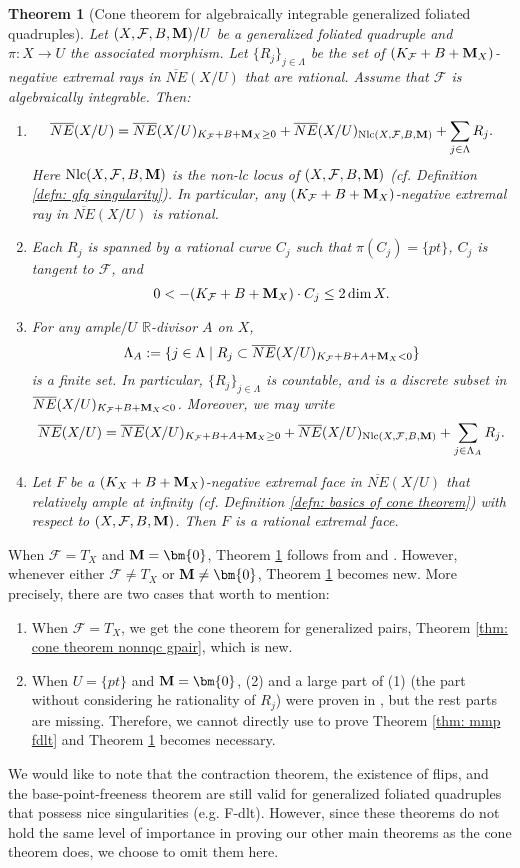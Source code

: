 \documentclass[11pt]{amsart}
\numberwithin{equation}{section}
\newcommand{\Mm}{{\bf{M}}}
\newcommand{\Rr}{\mathbb{R}}
\newcommand{\Nlc}{\operatorname{Nlc}}
\newcommand{\Ff}{\mathcal{F}}
\newtheorem{thm}{Theorem}[subsection]
\theoremstyle{definition}
\theoremstyle{definition}
\theoremstyle{definition}
\begin{document}
\begin{thm}[Cone theorem for algebraically integrable generalized foliated quadruples]\label{thm: cone theorem gfq}
Let $(X,\Ff,B,\Mm)/U$ be a generalized foliated quadruple and $\pi: X\rightarrow U$ the associated morphism. Let $\{R_j\}_{j\in\Lambda}$ be the set of $(K_{\Ff}+B+\Mm_X)$-negative extremal rays in $\overline{NE}(X/U)$ that are rational. Assume that $\Ff$ is algebraically integrable. Then:
\begin{enumerate}
    \item $$\overline{NE}(X/U)=\overline{NE}(X/U)_{K_{\Ff}+B+\Mm_X\geq 0}+\overline{NE}(X/U)_{\Nlc(X,\Ff,B,\Mm)}+\sum_{j\in\Lambda} R_j.$$
    Here $\Nlc(X,\Ff,B,\Mm)$ is the non-lc locus of $(X,\Ff,B,\Mm)$ (cf. Definition \ref{defn: gfq singularity}). In particular, any $(K_{\Ff}+B+\Mm_X)$-negative extremal ray in $\overline{NE}(X/U)$ is rational.
    \item Each $R_j$ is spanned by a rational curve $C_j$ such that $\pi(C_j)=\{pt\}$, $C_j$ is tangent to $\Ff$, and 
    $$0<-(K_{\Ff}+B+\Mm_X)\cdot C_j\leq 2\dim X.$$
    \item For any ample$/U$ $\Rr$-divisor $A$ on $X$,
    $$\Lambda_A:=\{j\in\Lambda\mid R_j\subset\overline{NE}(X/U)_{K_{\Ff}+B+A+\Mm_X<0}\}$$
    is a finite set. In particular, $\{R_j\}_{j\in\Lambda}$ is countable, and is a discrete subset in $\overline{NE}(X/U)_{K_{\Ff}+B+\Mm_X<0}$. Moreover, we may write
    $$\overline{NE}(X/U)=\overline{NE}(X/U)_{K_{\Ff}+B+A+\Mm_X\geq 0}+\overline{NE}(X/U)_{\Nlc(X,\Ff,B,\Mm)}+\sum_{j\in\Lambda_A}R_j.$$
    \item Let $F$ be a $(K_X+B+\Mm_X)$-negative extremal face in $\overline{NE}(X/U)$ that relatively ample at infinity (cf. Definition \ref{defn: basics of cone theorem}) with respect to $(X,\Ff,B,\Mm)$. Then $F$ is a rational extremal face.
\end{enumerate}
\end{thm}
 When $\Ff=T_X$ and $\Mm=\bm{0}$, Theorem \ref{thm: cone theorem gfq} follows from \cite[Theorem 5.10]{Amb03} and \cite[Theorem 4.5.2]{Fuj17}. However, whenever either $\Ff\not=T_X$ or $\Mm\not=\bm{0}$, Theorem \ref{thm: cone theorem gfq} becomes new. More precisely, there are two cases that worth to mention:
 \begin{enumerate}
 \item When $\Ff=T_X$, we get the cone theorem for generalized pairs, Theorem \ref{thm: cone theorem nonnqc gpair}, which is new.
 \item When $U=\{pt\}$ and $\Mm=\bm{0}$, (2) and a large part of (1) (the part without considering he rationality of $R_j$) were proven in \cite[Theorem 3.9]{ACSS21}, but the rest parts are missing. Therefore, we cannot directly use \cite[Theorem 3.9]{ACSS21} to prove Theorem \ref{thm: mmp fdlt} and Theorem \ref{thm: cone theorem gfq} becomes necessary.
 \end{enumerate}
We would like to note that the contraction theorem, the existence of flips, and the base-point-freeness theorem are still valid for generalized foliated quadruples that possess nice singularities (e.g. F-dlt). However, since these theorems do not hold the same level of importance in proving our other main theorems as the cone theorem does, we choose to omit them here.
\end{document}
